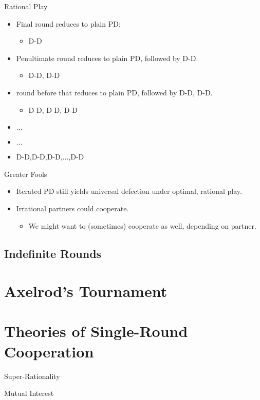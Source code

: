 \documentclass[pdf]{beamer}
\begin{document}
\begin{frame}{Rational Play}
  \begin{itemize}
  \item Final round reduces to plain PD;
    \begin{itemize}
      \item D-D
    \end{itemize}
  \pause\item Penultimate round reduces to plain PD, followed by D-D.
    \begin{itemize}
      \item D-D, D-D
    \end{itemize}
  \pause\item round before that reduces to plain PD, followed by D-D, D-D.
    \begin{itemize}
      \item D-D, D-D, D-D
    \end{itemize}
  \pause\item $\ldots$
  \pause\item $\ldots$
  \pause\item D-D,D-D,D-D,$\ldots$,D-D
\end{itemize}
\end{frame}

\begin{frame}{Greater Fools}
  \begin{itemize}
  \item Iterated PD still yields universal defection under optimal, rational play.
  \pause\item Irrational partners could cooperate.
  \begin{itemize}
    \item We might want to (sometimes) cooperate as well, depending on partner.
    \end{itemize}
  \end{itemize}
\end{frame}


\subsection{Indefinite Rounds}

\section{Axelrod's Tournament}


\section{Theories of Single-Round Cooperation}
\begin{frame}{Super-Rationality}
\end{frame}

\begin{frame}{Mutual Interest}
\end{frame}
\end{document}
